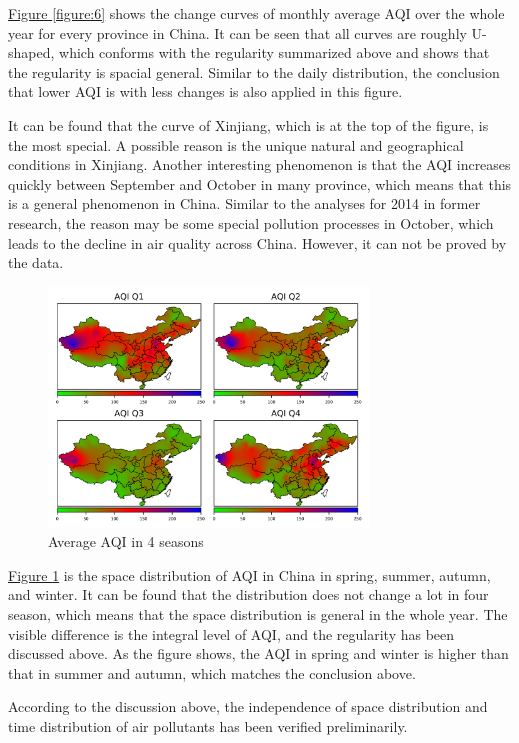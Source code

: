 \documentclass[letterpaper]{article}
\begin{document}
\begin{CJK*}{UTF8}{gkai}
\hyperref[figure:6]{Figure \ref*{figure:6}} shows the change curves of monthly average AQI over the whole year for every province in China. It can be seen that all curves are roughly U-shaped, which conforms with the regularity summarized above and shows that the regularity is spacial general. Similar to the daily distribution, the conclusion that lower AQI is with less changes is also applied in this figure.

It can be found that the curve of Xinjiang, which is at the top of the figure, is the most special. A possible reason is the unique natural and geographical conditions in Xinjiang. Another interesting phenomenon is that the AQI increases quickly between September and October in many province, which means that this is a general phenomenon in China. Similar to the analyses for 2014 in former research, the reason may be some special pollution processes in October, which leads to the decline in air quality across China. However, it can not be proved by the data.

\begin{figure}[h]
  \includegraphics[width = 8.5cm]{AQI_season.png}
  \caption{Average AQI in 4 seasons}
  \label{figure:7}
\end{figure}

\hyperref[figure:7]{Figure \ref*{figure:7}} is the space distribution of AQI in China in spring, summer, autumn, and winter. It can be found that the distribution does not change a lot in four season, which means that the space distribution is general in the whole year. The visible difference is the integral level of AQI, and the regularity has been discussed above. As the figure shows, the AQI in spring and winter is higher than that in summer and autumn, which matches the conclusion above.

According to the discussion above, the independence of space distribution and time distribution of air pollutants has been verified preliminarily.


\end{CJK*}
\end{document}
